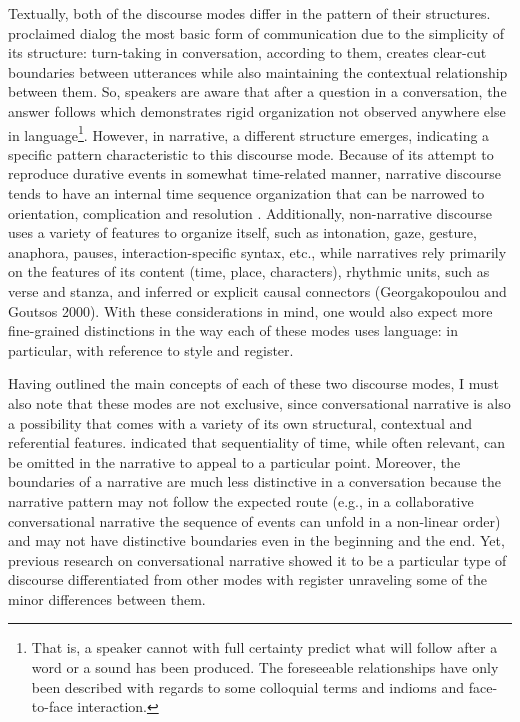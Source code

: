 \documentclass[12pt, draft]{article}
\begin{document}
Textually, both of the discourse modes differ in the pattern of their structures. \textcite{bakhtin1986} proclaimed dialog the most basic form of communication due to the simplicity of its structure: turn-taking in conversation, according to them, creates clear-cut boundaries between utterances while also maintaining the contextual relationship between them. So, speakers are aware that after a question in a conversation, the answer follows which demonstrates rigid organization not observed anywhere else in language\footnote{That is, a speaker cannot with full certainty predict what will follow after a word or a sound has been produced. The foreseeable relationships have only been described with regards to some colloquial terms and indioms and face-to-face interaction.}. However, in  narrative, a different structure emerges, indicating a specific pattern characteristic to this discourse mode. Because of its attempt to reproduce durative events in somewhat time-related manner, narrative discourse tends to have an internal time sequence organization that can be narrowed to orientation, complication and resolution \parencite{labov1967}. Additionally, non-narrative discourse uses a variety of features to organize itself, such as intonation, gaze, gesture, anaphora, pauses, interaction-specific syntax, etc., while narratives rely primarily on the features of its content (time, place, characters), rhythmic units, such as verse and stanza, and inferred or explicit causal connectors (Georgakopoulou and Goutsos 2000). With these considerations in mind, one would also expect more fine-grained distinctions in the way each of these modes uses language: in particular, with reference to style and register. 

Having outlined the main concepts of each of these two discourse modes, I must also note that these modes are not exclusive, since conversational narrative is also a possibility that comes with a variety of its own structural, contextual and referential features. \textcite{norrick2000} indicated that sequentiality of time, while often relevant, can be omitted in the narrative to appeal to a particular point. Moreover, the boundaries of a narrative are much less distinctive in a conversation because the narrative pattern may not follow the expected route (e.g., in a collaborative conversational narrative the sequence of events can unfold in a non-linear order) and may not have distinctive boundaries even in the beginning and the end. Yet, previous research on conversational narrative showed it to be a particular type of discourse differentiated from other modes with register unraveling some of the minor differences between them.
\end{document}
